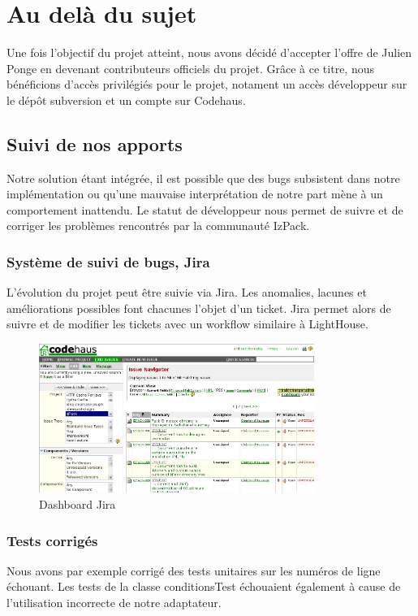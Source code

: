 \section{Au delà du sujet}
Une fois l'objectif du projet atteint, nous avons décidé d'accepter l'offre de Julien Ponge en devenant contributeurs officiels du projet.
Grâce à ce titre, nous bénéficions d'accès privilégiés pour le projet, notament un accès développeur sur le dépôt subversion et un compte sur Codehaus.
\subsection{Suivi de nos apports}
Notre solution étant intégrée, il est possible que des bugs subsistent dans notre implémentation ou qu'une mauvaise interprétation de notre part mène à un comportement inattendu.
Le statut de développeur nous permet de suivre et de corriger les problèmes rencontrés par la communauté IzPack.
\subsubsection{Système de suivi de bugs, Jira}
L'évolution du projet peut être suivie via Jira.
Les anomalies, lacunes et améliorations possibles font chacunes l'objet d'un ticket.
Jira permet alors de suivre et de modifier les tickets avec un workflow similaire à LightHouse.
\begin{figure}[H]
	\centering
	\includegraphics[width=0.8\textwidth]{../image/jira.png}
	\caption{Dashboard Jira}
\end{figure}
\subsubsection{Tests corrigés}
Nous avons par exemple corrigé des tests unitaires sur les numéros de ligne échouant.
Les tests de la classe conditionsTest échouaient également à cause de l'utilisation incorrecte de notre adaptateur.

